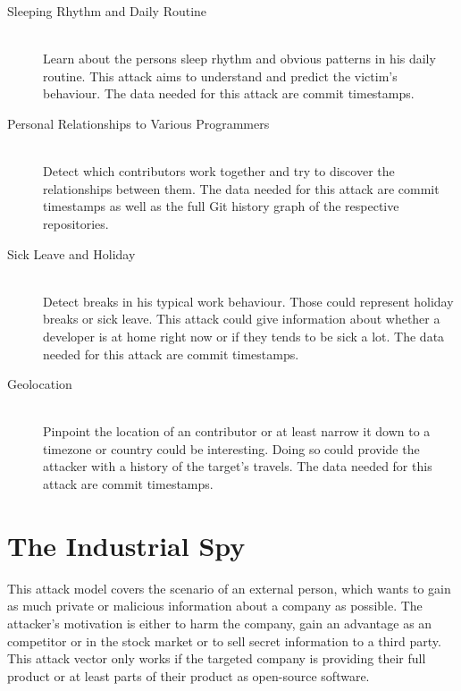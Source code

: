 \begin{description}
    \item[Sleeping Rhythm and Daily Routine] \hfill \\
        Learn about the persons sleep rhythm and obvious patterns in his daily routine.
        This attack aims to understand and predict the victim's behaviour.
        The data needed for this attack are commit timestamps.

    \item[Personal Relationships to Various Programmers] \hfill \\
        Detect which contributors work together and try to discover the relationships between them.
        The data needed for this attack are commit timestamps as well as the full Git history graph of the respective repositories.

    \item[Sick Leave and Holiday] \hfill \\
        Detect breaks in his typical work behaviour. Those could represent holiday breaks or sick leave.
        This attack could give information about whether a developer is at home right now or if they tends to be sick a lot.
        The data needed for this attack are commit timestamps.

    \item[Geolocation] \hfill \\
        Pinpoint the location of an contributor or at least narrow it down to a timezone or country could be interesting.
        Doing so could provide the attacker with a history of the target's travels.
        The data needed for this attack are commit timestamps.
\end{description}



\section{The Industrial Spy}\label{industrial-spy}
This attack model covers the scenario of an external person, which wants to gain as much private or malicious information about a company as possible.
The attacker's motivation is either to harm the company, gain an advantage as an competitor or in the stock market or to sell secret information to a third party.
This attack vector only works if the targeted company is providing their full product or at least parts of their product as open-source software.

